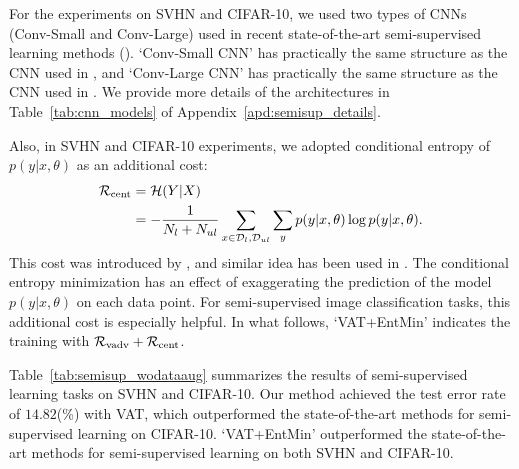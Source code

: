 \documentclass[10pt,journal,compsoc]{IEEEtran}
\begin{document}
For the experiments on SVHN and CIFAR-10, we used two types of CNNs (Conv-Small and Conv-Large) used in recent state-of-the-art semi-supervised learning methods (\cite{rasmus2015semi,springenberg2015unsupervised,salimans2016improved,laine2016temporal}). 
`Conv-Small CNN' has practically the same structure as the CNN used in \cite{salimans2016improved}, and `Conv-Large CNN' has practically the same structure as the CNN used in \cite{laine2016temporal}.
We provide more details of the architectures in Table~\ref{tab:cnn_models} of Appendix~\ref{apd:semisup_details}.

Also, in SVHN and CIFAR-10 experiments, we adopted conditional entropy of $p(y|x,\theta)$ as an additional cost: 
\begin{align}
	\mathcal{R}_{\rm cent} &= \mathcal{H}(Y|X) \nonumber \\
    &= -\frac{1}{N_l + N_{ul}}\sum_{x\in \mathcal{D}_l, \mathcal{D}_{ul}}\sum_{y} p(y|x, \theta) \log p(y|x, \theta).
\end{align}
This cost was introduced by \cite{grandvalet2004semi}, and similar idea has been used in \cite{sajjadi2016regularization}.
The conditional entropy minimization has an effect of exaggerating the prediction of the model $p(y|x,\theta)$ on each data point.
For semi-supervised image classification tasks, this additional cost is especially  helpful.  
In what follows, `VAT+EntMin' indicates the training with $\mathcal{R}_{\rm vadv} + \mathcal{R}_{\rm cent}$.

Table~\ref{tab:semisup_wodataaug} summarizes the results of semi-supervised learning tasks on SVHN and CIFAR-10.
Our method achieved the test error rate of $14.82$(\%) with VAT, which outperformed the state-of-the-art methods for semi-supervised learning on CIFAR-10. 
`VAT+EntMin' outperformed the state-of-the-art methods for semi-supervised learning on both SVHN and CIFAR-10.
\end{document}
